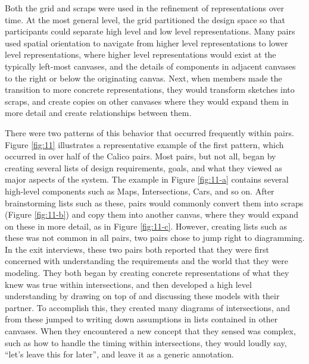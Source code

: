 Both the grid and scraps were used in the refinement of representations over time. At the most general level, the grid partitioned the design space so that participants could separate high level and low level representations. Many pairs used spatial orientation to navigate from higher level representations to lower level representations, where higher level representations would exist at the typically left-most canvases, and the details of components in adjacent canvases to the right or below the originating canvas. Next, when members made the transition to more concrete representations, they would transform sketches into scraps, and create copies on other canvases where they would expand them in more detail and create relationships between them. 

There were two patterns of this behavior that occurred frequently within pairs. Figure \ref{fig:11} illustrates a representative example of the first pattern, which occurred in over half of the Calico pairs. Most pairs, but not all, began by creating several lists of design requirements, goals, and what they viewed as major aspects of the system. The example in Figure \ref{fig:11-a} contains several high-level components such as Maps, Intersections, Cars, and so on. After brainstorming lists such as these, pairs would commonly convert them into scraps (Figure \ref{fig:11-b}) and copy them into another canvas, where they would expand on these in more detail, as in Figure \ref{fig:11-c}. However, creating lists such as these was not common in all pairs, two pairs chose to jump right to diagramming. In the exit interviews, these two pairs both reported that they were first concerned with understanding the requirements and the world that they were modeling. They both began by creating concrete representations of what they knew was true within intersections, and then developed a high level understanding by drawing on top of and discussing these models with their partner. To accomplish this, they created many diagrams of intersections, and from these jumped to writing down assumptions in lists contained in other canvases. When they encountered a new concept that they sensed was complex, such as how to handle the timing within intersections, they would loudly say, ``let's leave this for later'', and leave it as a generic annotation.

